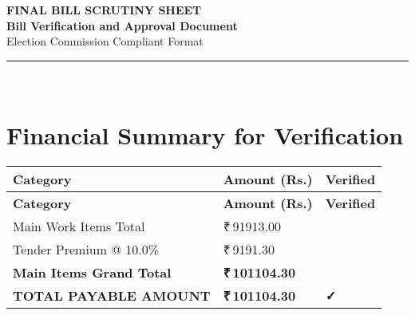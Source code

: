 \documentclass[12pt,a4paper]{article}
\newcommand{\rupees}[1]{₹\,#1}
\newcommand{\checkedbox}{\makebox[1em]{$\boxtimes$}}
\begin{document}
\begin{center}
    {\Huge\textbf{\textcolor{headerblue}{FINAL BILL SCRUTINY SHEET}}}\\[0.8cm]
    {\Large\textbf{Bill Verification and Approval Document}}\\[0.5cm]
    {\large Election Commission Compliant Format}\\[0.3cm]
    \rule{\textwidth}{2pt}\\[1cm]
\end{center}

\begin{center}
\end{center}

\vspace{1cm}

\section*{Financial Summary for Verification}

\begin{longtable}{|p{8cm}|p{3cm}|p{2cm}|}
\hline
\rowcolor{approvedgreen!20}
\textbf{Category} & \textbf{Amount (Rs.)} & \textbf{Verified} \\
\hline
\endfirsthead

\hline
\rowcolor{approvedgreen!20}
\textbf{Category} & \textbf{Amount (Rs.)} & \textbf{Verified} \\
\hline
\endhead

\hline
\endfoot

\hline
\endlastfoot

Main Work Items Total & \rupees{91913.00} & \checkedbox \\
\hline

Tender Premium @ 10.0\% & \rupees{9191.30} & \checkedbox \\
\hline

\rowcolor{lightgray}
\textbf{Main Items Grand Total} & \textbf{\rupees{101104.30}} & \checkedbox \\
\hline


\rowcolor{approvedgreen!30}
\textbf{TOTAL PAYABLE AMOUNT} & \textbf{\rupees{101104.30}} & \textcolor{approvedgreen}{\textbf{✓}} \\
\hline

\end{longtable}
\end{document}

